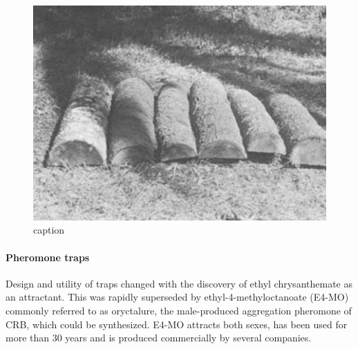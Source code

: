 \documentclass[twocolumn,letterpaper]{scrartcl}
\begin{document}
\begin{figure}[h]
	\centering
	\includegraphics[width=0.7\linewidth]{images/log-tap}
	\caption{caption}
	\label{fig:log-tap}
\end{figure}

\paragraph{Pheromone traps} Design and utility of traps changed with the discovery of ethyl chrysanthemate as an attractant. This was rapidly superseded by ethyl-4-methyloctanoate (E4-MO) commonly referred to as oryctalure, the male-produced aggregation pheromone of CRB, which could be synthesized. E4-MO attracts both sexes, has been used for more than 30 years and is produced commercially by several companies. 
\end{document}
